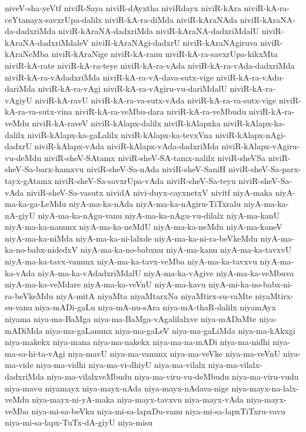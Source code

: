 {niveV-sha-yeVtf
niviR-Saya
niviR-dAyxtha
niviRdayx
niviR-kAra
niviR-kA-ra-ceYtanayx-savxrUpa-dalilx
niviR-kA-ra-diMda
niviR-kAraNAda
niviR-kAraNA-da-dadxriMda
niviR-kAraNA-dadxriMda
niviR-kAraNA-dadxriMdalU
niviR-kAraNA-dadxriMdaleV
niviR-kAraNAgi-dadxrU
niviR-kAraNAgiruva
niviR-kAraNeMba
niviR-kAraNige
niviR-kA-ranu
niviR-kA-ra-savxrUpa-kikxMta
niviR-kA-rate
niviR-kA-ra-teye
niviR-kA-ra-vAda
niviR-kA-ra-vAda-dadxriMda
niviR-kA-ra-vAdadxriMda
niviR-kA-ra-vA-dava-sutx-vige
niviR-kA-ra-vAdu-dariMda
niviR-kA-ra-vAgi
niviR-kA-ra-vAgiru-vu-dariMdalU
niviR-kA-ra-vAgiyU
niviR-kA-ravU
niviR-kA-ra-va-sutx-vAda
niviR-kA-ra-va-sutx-vige
niviR-kA-ra-va-sutx-vina
niviR-kA-ra-veMbu-dara
niviR-kA-ra-veMbudu
niviR-kA-ra-veMdu
niviR-kA-raveV
niviR-kAlapx-dalilx
niviR-kAlapxka
niviR-kAlapx-ka-dalilx
niviR-kAlapx-ka-gaLalilx
niviR-kAlapx-ka-tevxVna
niviR-kAlapx-nAgi-dadxrU
niviR-kAlapx-vAda
niviR-kAlapx-vAda-dadxriMda
niviR-kAlapx-vAgiru-vu-deMdu
niviR-sheV-SAtamx
niviR-sheV-SA-tamx-nalilx
niviR-sheVSa
niviR-sheV-Sa-barx-hamxvu
niviR-sheV-Sa-nAda
niviR-sheV-SaniH
niviR-sheV-Sa-parx-tayx-gAtamx
niviR-sheV-Sa-savxrUpa-vAda
niviR-sheV-Sa-teyu
niviR-sheV-Sa-vAda
niviR-sheV-Sa-vasutx
nividA
nivi-duyx-cayxnetxV
nivitf
niyA-maka
niyA-ma-ka-ga-LeMdu
niyA-ma-ka-nAda
niyA-ma-ka-nAgiru-TiTxralu
niyA-ma-ka-nA-giyU
niyA-ma-ka-nAgu-vanu
niyA-ma-ka-nAgu-vu-dilalx
niyA-ma-kanU
niyA-ma-ka-nanunx
niyA-ma-ka-neMdU
niyA-ma-ka-neMdu
niyA-ma-kaneV
niyA-ma-ka-niMda
niyA-ma-ka-ni-lalxde
niyA-ma-ka-ni-ra-beVkeMdu
niyA-ma-ka-no-babx-nidedxV
niyA-ma-ka-no-babxnu
niyA-ma-kanu
niyA-ma-ka-tavxvU
niyA-ma-ka-tavx-vanunx
niyA-ma-ka-tavx-veMba
niyA-ma-ka-tavxvu
niyA-ma-ka-vAda
niyA-ma-ka-vAdadxriMdalU
niyA-ma-ka-vAgive
niyA-ma-ka-veMbuva
niyA-ma-ka-veMdare
niyA-ma-ka-veVnU
niyA-ma-kavu
niyA-mi-ka-no-babx-ni-ra-beVkeMdu
niyA-mitA
niyaMta
niyaMtarxNa
niyaMtirx-su-vaMte
niyaMtirx-su-vanu
niya-mADi-gaLu
niya-mA-nu-sAra
niya-mA-thaR-dalilx
niyamAyx
niyama
niya-ma-BaMga
niya-ma-BaMga-vAgalilalxve
niya-mADaMte
niya-mADiMda
niya-ma-gaLanunx
niya-ma-gaLeV
niya-ma-gaLiMda
niya-ma-kAkxgi
niya-makekx
niya-mana
niya-ma-nakekx
niya-ma-na-mADi
niya-ma-nidhi
niya-ma-sa-hi-ta-vAgi
niya-mavU
niya-ma-vanunx
niya-ma-veVke
niya-ma-veVnU
niya-ma-vide
niya-ma-vidhi
niya-ma-vi-dhiyU
niya-ma-vilalx
niya-ma-vilalx-dadxriMda
niya-ma-vilalxveMbudu
niya-ma-viru-vu-deMbudu
niya-ma-viru-vudu
niya-mavu
niyamayx
niya-mayx-nAda
niya-mayx-nAdava-nige
niya-mayx-na-lalx-veMdu
niya-mayx-ni-yA-maka
niya-mayx-tavxvu
niya-mayx-vAda
niya-mayx-veMba
niya-mi-sa-beVku
niya-mi-sa-lapxDu-vanu
niya-mi-sa-lapxTiTxru-vavu
niya-mi-sa-lapx-TuTx-dA-giyU
niya-misu
}
